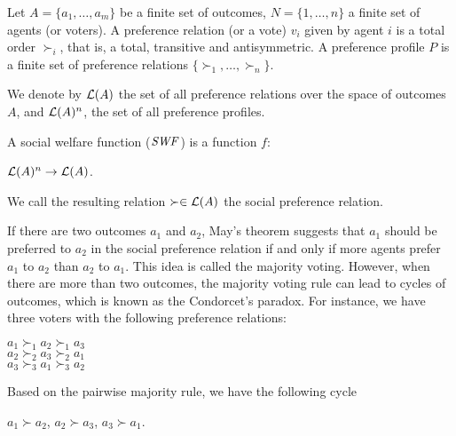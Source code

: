 \begin{definition}
	Let $A=\{a_1,\ldots,a_m\}$ be a finite set of outcomes,
	$N=\{1,\ldots,n\}$ a finite set of agents (or voters).
	A preference relation (or a vote) $v_i$ given by agent $i$ 
	is a total order $\succ_i$,
	that is, a total, transitive and antisymmetric.
	A preference profile $P$ is a finite set of preference relations
	$\{\succ_1, \ldots, \succ_n\}$.
\end{definition}

We denote by $\mathcal{L}(A)$ the set of all preference relations over
the space of outcomes $A$, and $\mathcal{L}(A)^n$, the set of all
preference profiles.

\begin{definition}
	A social welfare function ($\it{SWF}$) is a function $f$:
	\begin{center}
		$\mathcal{L}(A)^n \rightarrow \mathcal{L}(A)$.
	\end{center}
	We call the resulting relation $\succ \in \mathcal{L}(A)$ the social preference relation.
\end{definition}

If there are two outcomes $a_1$ and $a_2$,
May's theorem \cite{May52} suggests that $a_1$ should be
preferred to $a_2$ in the social preference relation
if and only if more agents prefer $a_1$ to $a_2$ than
$a_2$ to $a_1$.
This idea is called the majority voting.
However, when there are more than two outcomes,
the majority voting rule can lead to cycles of
outcomes, which is known as the Condorcet's paradox.
For instance, we have three voters with the following
preference relations:
\begin{center}
	$a_1 \succ_1 a_2 \succ_1 a_3$\\
	$a_2 \succ_2 a_3 \succ_2 a_1$\\
	$a_3 \succ_3 a_1 \succ_3 a_2$
\end{center}
Based on the pairwise majority rule, we have the following cycle
\begin{center}
	$a_1 \succ a_2$, $a_2 \succ a_3$, $a_3 \succ a_1$. 
\end{center}

